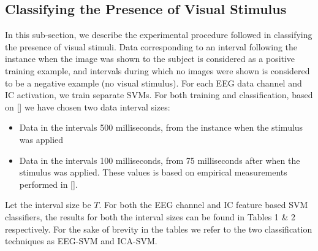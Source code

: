 \documentclass{article} %
\begin{document}
\subsection{Classifying the Presence of Visual Stimulus}
In this sub-section, we describe the experimental procedure followed in classifying the presence of visual stimuli. Data corresponding to an interval following the instance when the image was shown to the subject is considered as a positive training example, and intervals during which no images were shown is considered to be a negative example (no visual stimulus). For each EEG data channel and IC activation, we train separate SVMs. For both training and classification, based on [] we have chosen two data interval sizes:

\begin{itemize}
	\item Data in the intervals 500 milliseconds, from the instance when the stimulus was applied
	\item Data in the intervals 100 milliseconds, from 75 milliseconds after when the stimulus was applied. These values is based on empirical measurements performed in [].
\end{itemize}
Let the interval size be $T$. For both the EEG channel and IC feature based SVM classifiers, the results for both the interval sizes can be found in Tables 1 \& 2 respectively. For the sake of brevity in the tables we refer to the two classification techniques as EEG-SVM and ICA-SVM. 
\end{document}
